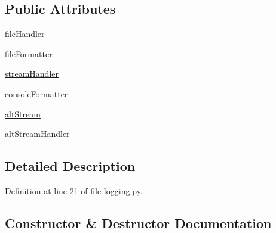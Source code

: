 \subsection*{Public Attributes}
\begin{DoxyCompactItemize}
\item 
\hyperlink{classparlai_1_1utils_1_1logging_1_1ParlaiLogger_a50c9155a1b765f79e15d64090ad0a236}{file\+Handler}
\item 
\hyperlink{classparlai_1_1utils_1_1logging_1_1ParlaiLogger_ae795816c275c3f3756f72d542a965748}{file\+Formatter}
\item 
\hyperlink{classparlai_1_1utils_1_1logging_1_1ParlaiLogger_a2c40840c6e6fa00eb4cdae9146907b78}{stream\+Handler}
\item 
\hyperlink{classparlai_1_1utils_1_1logging_1_1ParlaiLogger_ac973ab3558d792af0494970d14ee2c5e}{console\+Formatter}
\item 
\hyperlink{classparlai_1_1utils_1_1logging_1_1ParlaiLogger_a5b1bdad4c97a74ea4e38f678ae0edd2c}{alt\+Stream}
\item 
\hyperlink{classparlai_1_1utils_1_1logging_1_1ParlaiLogger_acaf2a0925cad1af3df14b3776f900f55}{alt\+Stream\+Handler}
\end{DoxyCompactItemize}


\subsection{Detailed Description}


Definition at line 21 of file logging.\+py.



\subsection{Constructor \& Destructor Documentation}
\mbox{\label{classparlai_1_1utils_1_1logging_1_1ParlaiLogger_ade632e1d848beb962a35797c02f51407}} 
